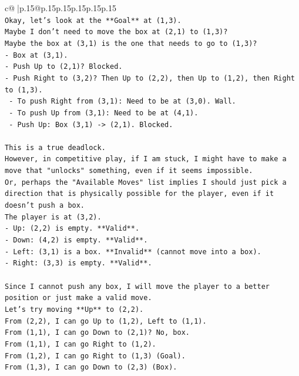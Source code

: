 \documentclass{article}
\begin{document}
{\begin{supertabular}{c@{$\;$}|p{.15\linewidth}@{}p{.15\linewidth}p{.15\linewidth}p{.15\linewidth}p{.15\linewidth}p{.15\linewidth}}
{{{\\ 
\texttt{Okay, let's look at the **Goal** at (1,3).} \\
\texttt{Maybe I don't need to move the box at (2,1) to (1,3)?} \\
\texttt{Maybe the box at (3,1) is the one that needs to go to (1,3)?} \\
\texttt{{-} Box at (3,1).} \\
\texttt{{-} Push Up to (2,1)? Blocked.} \\
\texttt{{-} Push Right to (3,2)? Then Up to (2,2), then Up to (1,2), then Right to (1,3).} \\
\texttt{  {-} To push Right from (3,1): Need to be at (3,0). Wall.} \\
\texttt{  {-} To push Up from (3,1): Need to be at (4,1).} \\
\texttt{    {-} Push Up: Box (3,1) {-}> (2,1). Blocked.} \\
\\ 
\texttt{This is a true deadlock.} \\
\texttt{However, in competitive play, if I am stuck, I might have to make a move that "unlocks" something, even if it seems impossible.} \\
\texttt{Or, perhaps the "Available Moves" list implies I should just pick a direction that is physically possible for the player, even if it doesn't push a box.} \\
\texttt{The player is at (3,2).} \\
\texttt{{-} Up: (2,2) is empty. **Valid**.} \\
\texttt{{-} Down: (4,2) is empty. **Valid**.} \\
\texttt{{-} Left: (3,1) is a box. **Invalid** (cannot move into a box).} \\
\texttt{{-} Right: (3,3) is empty. **Valid**.} \\
\\ 
\texttt{Since I cannot push any box, I will move the player to a better position or just make a valid move.} \\
\texttt{Let's try moving **Up** to (2,2).} \\
\texttt{From (2,2), I can go Up to (1,2), Left to (1,1).} \\
\texttt{From (1,1), I can go Down to (2,1)? No, box.} \\
\texttt{From (1,1), I can go Right to (1,2).} \\
\texttt{From (1,2), I can go Right to (1,3) (Goal).} \\
\texttt{From (1,3), I can go Down to (2,3) (Box).} \\
}}}
\end{supertabular}}
\end{document}

